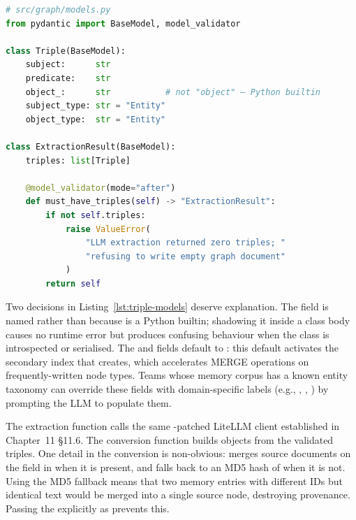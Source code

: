 \begin{lstlisting}[language=Python,
  caption={Triple and ExtractionResult Pydantic models},
  label={lst:triple-models}]
# src/graph/models.py
from pydantic import BaseModel, model_validator

class Triple(BaseModel):
    subject:      str
    predicate:    str
    object_:      str           # not "object" — Python builtin
    subject_type: str = "Entity"
    object_type:  str = "Entity"

class ExtractionResult(BaseModel):
    triples: list[Triple]

    @model_validator(mode="after")
    def must_have_triples(self) -> "ExtractionResult":
        if not self.triples:
            raise ValueError(
                "LLM extraction returned zero triples; "
                "refusing to write empty graph document"
            )
        return self
\end{lstlisting}

Two decisions in Listing~\ref{lst:triple-models} deserve explanation.
The field is named  rather than  because
 is a Python builtin; shadowing it inside a class body causes
no runtime error but produces confusing behaviour when the class is
introspected or serialised. The  and 
fields default to : this default activates the
 secondary index that
 creates, which
accelerates MERGE operations on frequently-written node types. Teams whose
memory corpus has a known entity taxonomy can override these fields with
domain-specific labels (e.g., , ,
) by prompting the LLM to populate them.

The extraction function calls the same -patched LiteLLM
client established in Chapter~11 \S11.6. The conversion function builds
 objects from the validated triples. One detail in the
conversion is non-obvious:  merges source
documents on the  field in  when it is
present, and falls back to an MD5 hash of  when it is
not. Using the MD5 fallback means that two memory entries with different
IDs but identical text would be merged into a single source node,
destroying provenance. Passing the  explicitly as
 prevents this.

